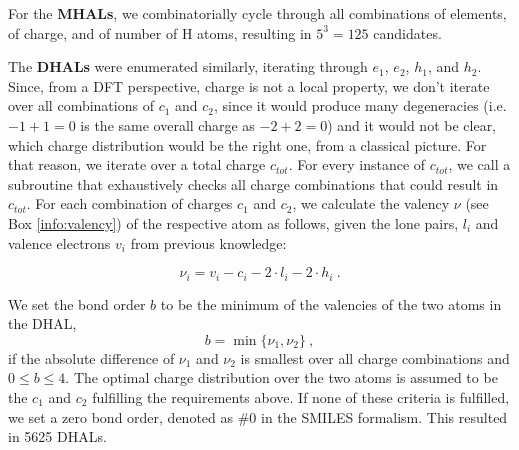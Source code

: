 \documentclass[]{article}
\begin{document}
For the \textbf{MHALs}, we combinatorially cycle through all combinations of elements, of charge, and of number of H atoms, resulting in $5^3=125$ candidates. 

The \textbf{DHALs} were enumerated similarly, iterating through $e_1$, $e_2$, $h_1$, and $h_2$. Since, from a DFT perspective, charge is not a local property, we don't iterate over all combinations of $c_1$ and $c_2$, since it would produce many degeneracies (i.e. $-1+1=0$ is the same overall charge as $-2+2=0$) and it would not be clear, which charge distribution would be the right one, from a classical picture. For that reason, we iterate over a total charge $c_{tot}$. For every instance of $c_{tot}$, we call a subroutine that exhaustively checks all charge combinations that could result in $c_{tot}$. For each combination of charges $c_1$ and $c_2$, we calculate the valency $\nu$ (see Box \ref{info:valency}) of the respective atom as follows, given the lone pairs, $l_i$ and valence electrons $v_i$ from previous knowledge:

\begin{equation}
\label{eq:valency}
\nu_i = v_i - c_i - 2 \cdot l_i - 2 \cdot h_i ~. 
\end{equation}

We set the bond order $b$ to be the minimum of the valencies of the two atoms in the DHAL,
\begin{equation}
b = \min{\{\nu_1,\nu_2\}} ~,
\end{equation}
if the absolute difference of $\nu_1$ and $\nu_2$ is smallest over all charge combinations and $0 \leq b \leq 4$. The optimal charge distribution over the two atoms is assumed to be the $c_1$ and $c_2$ fulfilling the requirements above. If none of these criteria is fulfilled, we set a zero bond order, denoted as $\#0$ in the SMILES formalism. This resulted in 5625 DHALs.
\end{document}
